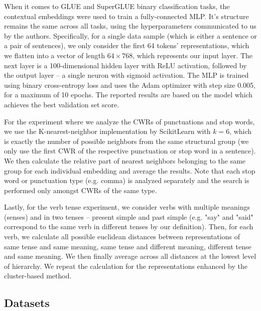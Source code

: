 When it comes to GLUE and SuperGLUE binary classification tasks, the contextual embeddings were used to train a fully-connected MLP. It's structure remains the same across all tasks, using the hyperparameters communicated to us by the authors. Specifically, for a single data sample (which is either a sentence or a pair of sentences), we only consider the first 64 tokens' representations, which we flatten into a vector of length $64 \times 768$, which represents our input layer. The next layer is a 100-dimensional hidden layer with ReLU activation, followed by the output layer -- a single neuron with sigmoid activation. The MLP is trained using binary cross-entropy loss and uses the Adam optimizer with step size 0.005, for a maximum of 10 epochs. The reported results are based on the model which achieves the best validation set score.

For the experiment where we analyze the CWRs of punctuations and stop words, we use the K-nearest-neighbor implementation by ScikitLearn with $k=6$, which is exactly the number of possible neighbors from the same structural group (we only use the first CWR of the respective punctuation or stop word in a sentence). We then calculate the relative part of nearest neighbors belonging to the same group for each individual embedding and average the results. Note that each stop word or punctuation type (e.g. comma) is analyzed separately and the search is performed only amongst CWRs of the same type. 

Lastly, for the verb tense experiment, we consider verbs with multiple meanings (senses) and in two tenses -- present simple and past simple (e.g. "say" and "said" correspond to the same verb in different tenses by our definition). Then, for each verb, we calculate all possible euclidean distances between representations of same tense and same meaning, same tense and different meaning, different tense and same meaning. We then finally average across all distances at the lowest level of hierarchy. We repeat the calculation for the representations enhanced by the cluster-based method.


\subsection{Datasets}

